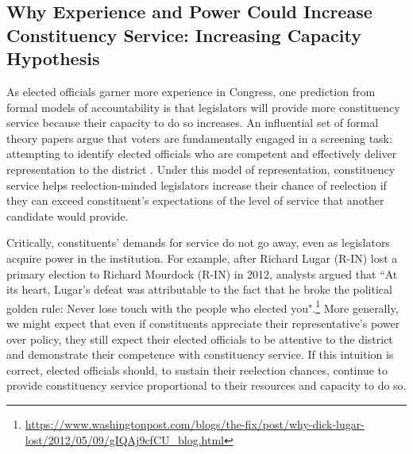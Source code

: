 \documentclass[12pt]{article}
\begin{document}
\subsection{Why Experience and Power Could Increase Constituency Service: Increasing Capacity Hypothesis}


As elected officials garner more experience in Congress, one prediction from formal models of accountability is that legislators will provide more constituency service because their capacity to do so increases. An influential set of formal theory papers argue that voters are fundamentally engaged in a screening task: attempting to identify elected officials who are competent and effectively deliver representation to the district \citep{AshworthBuenodeMesquita2006, gordon2009advantages}. Under this model of representation, constituency service helps reelection-minded legislators increase their chance of reelection if they can exceed constituent's expectations of the level of service that another candidate would provide.  

Critically, constituents' demands for service do not go away, even as legislators acquire power in the institution. For example, after Richard Lugar (R-IN) lost a primary election to Richard Mourdock (R-IN) in 2012, analysts argued that ``At its heart, Lugar's defeat was attributable to the fact that he broke the political golden rule: Never lose touch with the people who elected you".\footnote{\url{https://www.washingtonpost.com/blogs/the-fix/post/why-dick-lugar-lost/2012/05/09/gIQAj9cfCU_blog.html}} %
More generally, we might expect that even if constituents appreciate their representative's power over policy, they still expect their elected officials to be attentive to the district and demonstrate their competence with constituency service. If this intuition is correct, elected officials should, to sustain their reelection chances, continue to provide constituency service proportional to their resources and capacity to do so. %
\end{document}
